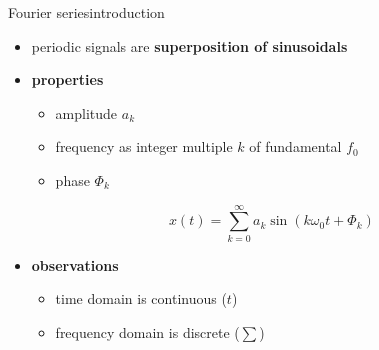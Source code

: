     \begin{frame}{Fourier series}{introduction}
        \begin{itemize}
            \item   periodic signals are \textbf{superposition of sinusoidals}
            \smallskip
            \item<2-> \textbf{properties}
                \begin{itemize}
                    \item   amplitude $a_k$
                    \item   frequency as integer multiple $k$ of fundamental $f_0$
                    \item   phase $\Phi_k$
                \end{itemize}
                \begin {equation*}
                    x(t) = \sum\limits_{k=0}^{\infty} a_k \sin(k\omega_0 t + \Phi_k) \nonumber
                \end {equation*}
            \smallskip
            \item<3->   \textbf{observations}
                \begin{itemize}
                    \item   time domain is continuous ($t$)
                    \item   frequency domain is discrete ($\sum$)
                \end{itemize}
        \end{itemize}
    \end{frame}

